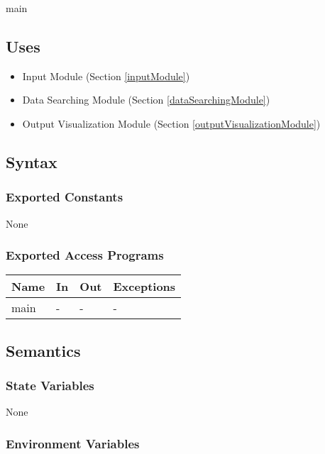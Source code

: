 \documentclass[12pt, titlepage]{article}
\begin{document}
main

\subsection{Uses}
\begin{itemize}
\item Input Module (Section \ref{inputModule})
\item Data Searching Module (Section \ref{dataSearchingModule})
\item Output Visualization Module (Section \ref{outputVisualizationModule})
\end{itemize}


\subsection{Syntax}

\subsubsection{Exported Constants}

None

\subsubsection{Exported Access Programs}

\begin{center}
\begin{tabular}{p{2cm} p{5cm} p{4cm} p{2cm}}
\hline
\textbf{Name} & \textbf{In} & \textbf{Out} & \textbf{Exceptions} \\
\hline
main & -  & - & - \\
\hline
\end{tabular}
\end{center}

\subsection{Semantics}

\subsubsection{State Variables}
None

\subsubsection{Environment Variables}
\end{document}
